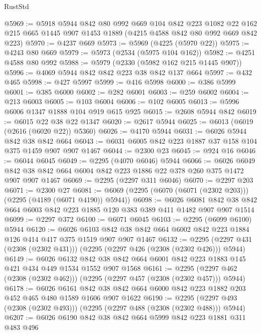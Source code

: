\begin{lexlean}{RustStd}
\begin{coremodule}
@5969 := @5918
    @5944
    @842
    @80
    @992
    @669
    @104
    @842
    @223
    @1082
    @22
    @162
    @215
    @665
    @1445
    @907
    @1453
    @1889
    (@4215 @4588 @842 @80 @992 @669 @842 @223)
@5970 := @4237 @669
@5973 := @5969 (@4225 (@5970 @22))
@5975 := @4243 @80 @669
@5979 := @5973 (@2534 (@5975 @104 @162))
@5982 := @4251 @4588 @80 @992
@5988 := @5979 (@2330 (@5982 @162 @215 @1445 @907))
@5996 := @4069 @5944 @842 @842 @223 @38 @842 @137 @664
@5997 := @432 @465
@5998 := @427 @5997
@5999 := @416 @5998
@6000 := @386 @5999
@6001 := @385 @6000
@6002 := @282 @6001
@6003 := @259 @6002
@6004 := @213 @6003
@6005 := @103 @6004
@6006 := @102 @6005
@6013 := @5996 @6006 @1347 @1888 @104 @919 @615 @925
@6015 := @2608 @5944 @842
@6019 := @6015 @22 @38 @22 @1347
@6020 := @2617 @5944
@6025 := @6013 (@6019 (@2616 (@6020 @22)) @5360)
@6026 := @4170 @5944
@6031 := @6026 @5944 @842 @38 @842 @664
@6043 := @6031 @6005 @842 @223 @1887 @37 @158 @104 @375 @1459 @907 @907 @1467
@6044 := @2300 @23
@6045 := @924 @16
@6046 := @6044 @6045
@6049 := @2295 (@4070 @6046) @5944
@6066 := @6026
    @6049
    @842
    @38
    @842
    @664
    @6004
    @842
    @223
    @1886
    @22
    @378
    @260
    @375
    @1472
    @907
    @907
    @1467
@6069 := @2295 (@2297 @311 @6046)
@6070 := @2297 @203
@6071 := @2300 @27
@6081 := @6069 (@2295 (@6070 (@6071 (@2302 @203))) (@2295 (@4189 (@6071 @4190)) @5944))
@6098 := @6026
    @6081
    @842
    @38
    @842
    @664
    @6003
    @842
    @223
    @1885
    @120
    @383
    @389
    @411
    @1482
    @907
    @907
    @1514
@6099 := @2297 @372
@6100 := @6071 @6045
@6103 := @2295 (@6099 @6100) @5944
@6120 := @6026
    @6103
    @842
    @38
    @842
    @664
    @6002
    @842
    @223
    @1884
    @126
    @414
    @417
    @375
    @1519
    @907
    @907
    @1467
@6132 := @2295 (@2297 @431 (@2308 (@2302 @431))) (@2295 (@2297 @426 (@2308 (@2302 @426))) @5944)
@6149 := @6026
    @6132
    @842
    @38
    @842
    @664
    @6001
    @842
    @223
    @1883
    @145
    @421
    @434
    @449
    @1534
    @1552
    @907
    @1568
@6161 := @2295 (@2297 @462 (@2308 (@2302 @462))) (@2295 (@2297 @457 (@2308 (@2302 @457))) @5944)
@6178 := @6026
    @6161
    @842
    @38
    @842
    @664
    @6000
    @842
    @223
    @1882
    @203
    @452
    @465
    @480
    @1589
    @1606
    @907
    @1622
@6190 := @2295 (@2297 @493 (@2308 (@2302 @493))) (@2295 (@2297 @488 (@2308 (@2302 @488))) @5944)
@6207 := @6026
    @6190
    @842
    @38
    @842
    @664
    @5999
    @842
    @223
    @1881
    @311
    @483
    @496

\end{coremodule}
\end{lexlean}
